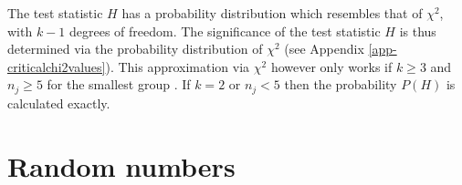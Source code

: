\documentclass[
]{book}
\begin{document}
The test statistic \(H\) has a probability distribution which resembles that of
\(\chi^2\), with \(k-1\) degrees of freedom. The significance of the
test statistic \(H\) is thus determined via the probability distribution of
\(\chi^2\) (see Appendix \ref{app-criticalchi2values}).
This approximation via \(\chi^2\) however only works if \(k\ge3\)
and \(n_j\ge5\) for the smallest group \citep{Ferg89}.
If \(k=2\) or \(n_j<5\) then the probability \(P(H)\) is calculated exactly.

\hypertarget{appendix-appendices}{%
\appendix}


\hypertarget{app-randomnumbers}{%
\chapter{Random numbers}\label{app-randomnumbers}}
\end{document}

